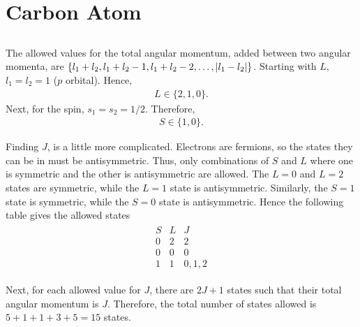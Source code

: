 \documentclass[
a4paper,
10pt,
twoside,
]{article}
\begin{document}
{}
\maketitle
\startmcols

\section{Carbon Atom}\label{sec: I}
\subsection{} \label{ssec: IA}

The allowed values for the total angular momentum, added between two angular momenta, are $\{l_1+l_2,l_1+l_2-1,l_1+l_2-2,\dots,\abs{l_1-l_2}\}$.
Starting with $L$, $l_1 = l_2 = 1$ ($p$ orbital).
Hence,
\begin{align}
	L \in \{2,1,0\}.
\end{align}
Next, for the spin, $s_1 = s_2 = 1/2$.
Therefore,
\begin{align}
	S \in \{1,0\}.
\end{align}

Finding $J$, is a little more complicated.
Electrons are fermions, so the states they can be in must be antisymmetric.
Thus, only combinations of $S$ and $L$ where one is symmetric and the other is antisymmetric are allowed.
The $L = 0$ and $L = 2$ states are symmetric, while the $L = 1$ state is antisymmetric.
Similarly, the $S = 1$ state is symmetric, while the $S = 0$ state is antisymmetric.
Hence the following table gives the allowed states
\begin{align}
	\begin{array}{ccc}
		S & L & J\\\hline
		0 & 2 & 2\\
		0 & 0 & 0\\
		1 & 1 & 0,1,2
	\end{array}\nonumber
\end{align}

Next, for each allowed value for $J$, there are $2J+1$ states such that their total angular momentum is $J$.
Therefore, the total number of states allowed is $5 + 1 + 1 + 3 + 5 = 15$ states.

\subsection{} \label{ssec: IB}
\end{document}
